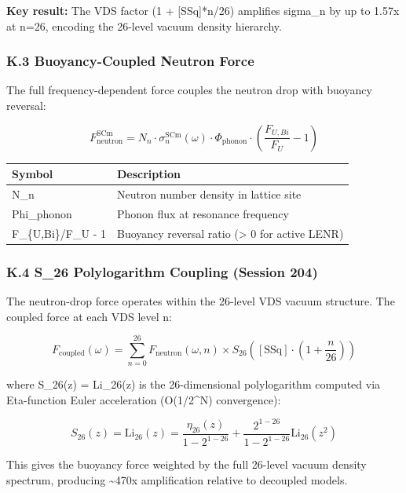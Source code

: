 \documentclass[
  11pt,
]{article}
\newcounter{none} %
\begin{document}
\textbf{Key result:} The VDS factor (1 + {[}SSq{]}*n/26) amplifies
sigma\_n by up to 1.57x at n=26, encoding the 26-level vacuum density
hierarchy.

\subsubsection{K.3 Buoyancy-Coupled Neutron
Force}\label{k.3-buoyancy-coupled-neutron-force}

The full frequency-dependent force couples the neutron drop with
buoyancy reversal:

\[F_{\mathrm{neutron}}^{\mathrm{SCm}} = N_n \cdot \sigma_n^{\mathrm{SCm}}(\omega) \cdot \Phi_{\mathrm{phonon}} \cdot \left(\frac{F_{U,Bi}}{F_U} - 1\right)\]

{\def\LTcaptype{none} %
\begin{longtable}[]{@{}ll@{}}
\toprule\noalign{}
Symbol & Description \\
\midrule\noalign{}
\endhead
\bottomrule\noalign{}
\endlastfoot
N\_n & Neutron number density in lattice site \\
Phi\_phonon & Phonon flux at resonance frequency \\
F\_\{U,Bi\}/F\_U - 1 & Buoyancy reversal ratio (\textgreater{} 0 for
active LENR) \\
\end{longtable}
}

\subsubsection{K.4 S\_26 Polylogarithm Coupling (Session
204)}\label{k.4-s_26-polylogarithm-coupling-session-204}

The neutron-drop force operates within the 26-level VDS vacuum
structure. The coupled force at each VDS level n:

\[F_{\mathrm{coupled}}(\omega) = \sum_{n=0}^{26} F_{\mathrm{neutron}}(\omega, n) \times S_{26}\!\left([\text{SSq}] \cdot \left(1 + \frac{n}{26}\right)\right)\]

where S\_26(z) = Li\_26(z) is the 26-dimensional polylogarithm computed
via Eta-function Euler acceleration (O(1/2\^{}N) convergence):

\[S_{26}(z) = \text{Li}_{26}(z) = \frac{\eta_{26}(z)}{1 - 2^{1-26}} + \frac{2^{1-26}}{1 - 2^{1-26}} \text{Li}_{26}(z^2)\]

This gives the buoyancy force weighted by the full 26-level vacuum
density spectrum, producing \textasciitilde470x amplification relative
to decoupled models.
\end{document}
